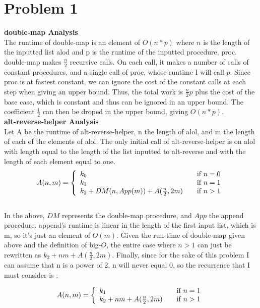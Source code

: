 \documentclass[12pt,letterpaper]{article}
\newenvironment{answer}[1]{
  \section*{Problem #1}
}{\newpage}
\begin{document}
\begin{answer}{1}
\textbf{double-map Analysis} \\

The runtime of double-map is an element of $O(n*p)$ where $n$ is the length of the inputted list alod and p is the runtime of the inputted procedure, proc. double-map makes $\frac{n}{2}$ recursive calls. On each call, it makes a number of calls of constant procedures, and a single call of proc, whose runtime I will call $p$. Since proc is at fastest constant, we can ignore the cost of the constant calls at each step when giving an upper bound. Thus, the total work is $\frac{n}{2}p$ plus the cost of the base case, which is constant and thus can be ignored in an upper bound. The coefficient $\frac{1}{2}$ can then be droped in the upper bound, giving $O(n*p)$.\\



\textbf{alt-reverse-helper Analysis} \\

Let A be the runtime of alt-reverse-helper, n the length of alol, and m the length of each of the elements of alol. The only initial call of alt-reverse-helper is on alol with length equal to the length of the list inputted to alt-reverse and with the length of each element equal to one.
\[ A(n,m) = \left\{ 
  \begin{array}{l l}
    k_0 & \quad \text{if $n = 0$}\\
    k_1 & \quad \text{if $n = 1$}\\
    k_2 + DM(n, App(m)) + A(\frac{n}{2}, 2m) & \quad \text{if $n > 1$}
  \end{array} \right.\]\\
  
In the above, $DM$ represents the double-map procedure, and $App$ the append procedure. append's runtime is linear in the length of the first input list, which is m, so it's just an element of $O(m)$. Given the run-time of double-map given above and the definition of big-$O$, the entire case where $n>1$ can just be rewritten as $k_2 + nm+ A(\frac{n}{2}, 2m)$. Finally, since for the sake of this problem I can assume that n is a power of 2, n will never equal 0, so the recurrence that I must consider is :

\[ A(n, m) = \left\{ 
  \begin{array}{l l}
    k_1 & \quad \text{if $n = 1$}\\
    k_2 + nm + A(\frac{n}{2}, 2m) & \quad \text{if $n > 1$}
  \end{array} \right.\]\\





\end{answer}
\end{document}
